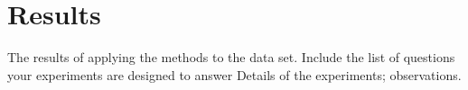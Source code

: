 \section{Results}
 {
  \color{red}
  The results of applying the methods to the data set. Include the list of questions your experiments are designed to answer Details of the experiments; observations.
 }

